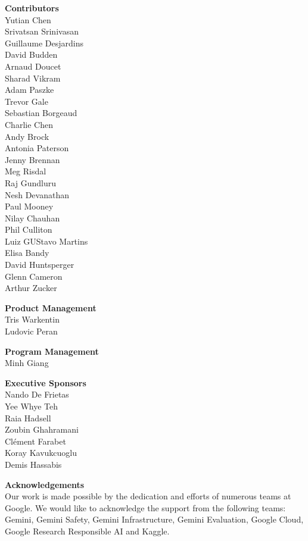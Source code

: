 \noindent\textbf{Contributors} \\
Yutian Chen \\
Srivatsan Srinivasan \\
Guillaume Desjardins \\
David Budden \\
Arnaud Doucet \\
Sharad Vikram \\
Adam Paszke \\
Trevor Gale \\
Sebastian Borgeaud \\
Charlie Chen \\
Andy Brock \\
Antonia Paterson \\
Jenny Brennan \\
Meg Risdal \\
Raj Gundluru \\
Nesh Devanathan \\
Paul Mooney \\
Nilay Chauhan \\
Phil Culliton \\
Luiz GUStavo Martins \\
Elisa Bandy \\
David Huntsperger \\
Glenn Cameron \\
Arthur Zucker


\noindent\textbf{Product Management} \\
Tris Warkentin \\
Ludovic Peran

\noindent\textbf{Program Management} \\
Minh Giang

\noindent\textbf{Executive Sponsors} \\
Nando De Frietas \\
Yee Whye Teh \\
Raia Hadsell \\
Zoubin Ghahramani \\
Clément Farabet \\
Koray Kavukcuoglu \\
Demis Hassabis

\noindent\textbf{Acknowledgements} \\
Our work is made possible by the dedication and efforts of numerous teams at Google. We
would like to acknowledge the support from the following teams: Gemini, Gemini Safety, Gemini Infrastructure, Gemini Evaluation, Google Cloud, Google Research Responsible AI and Kaggle.


